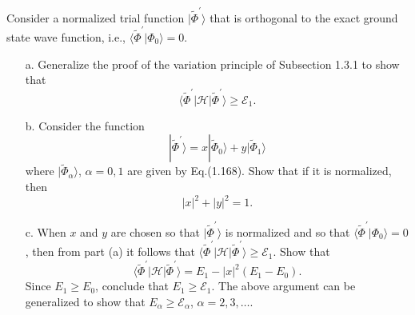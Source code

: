 \documentclass[a4paper]{book}
\newcounter{exercise}[chapter]
\begin{document}
	\begin{exercise}
	Consider a normalized trial function $|\tilde{\Phi}^\prime \rangle$ that is orthogonal to the exact ground state wave function, i.e., $\langle \tilde{\Phi}^\prime | \Phi_0 \rangle = 0$.
	\begin{enumerate}
	
	\item[a.] Generalize the proof of the variation principle of Subsection 1.3.1 to show that
	\[
		\langle \tilde{\Phi}^\prime | \mathscr{H} | \tilde{\Phi}^\prime \rangle \geq \mathscr{E}_1.
	\]	

	\item[b.] Consider the function
	\[
		| \tilde{\Phi}^\prime \rangle = x | \tilde{\Phi}_0 \rangle + y | \tilde{\Phi}_1 \rangle
	\]
	where $| \tilde{\Phi}_\alpha \rangle$, $\alpha = 0, 1$ are given by Eq.(1.168). Show that if it is normalized, then
	\[
		|x|^2 + |y|^2 = 1.
	\]
	
	\item[c.] When $x$ and $y$ are chosen so that $| \tilde{\Phi}^\prime \rangle$ is normalized and so that $\langle \tilde{\Phi}^\prime | \Phi_0 \rangle = 0$, then from part (a) it follows that $\langle \tilde{\Phi}^\prime | \mathscr{H} | \tilde{\Phi}^\prime \rangle \geq \mathscr{E}_1$. Show that
	\[
		\langle \tilde{\Phi}^\prime | \mathscr{H} | \tilde{\Phi}^\prime \rangle = E_1 - |x|^2 ( E_1 - E_0 ).
	\]
	Since $E_1 \geq E_0$, conclude that $E_1 \geq \mathscr{E}_1$. The above argument can be generalized to show that $E_\alpha \geq \mathscr{E}_\alpha$, $\alpha=2,3,\ldots$.
	
	\end{enumerate}
	\end{exercise}
	
\end{document}
